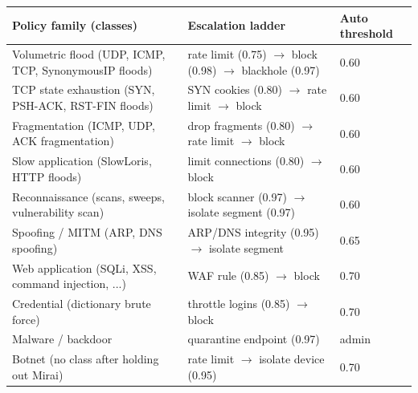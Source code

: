 \documentclass[]{interact}
\theoremstyle{plain}
\theoremstyle{definition}
\begin{document}
\begin{table}[htbp]
{\small
\begin{tabular}{lll}
\toprule
Policy family (classes) & Escalation ladder & Auto threshold \\
\midrule
Volumetric flood (UDP, ICMP, TCP, SynonymousIP floods) & rate limit (0.75) $\rightarrow$ block (0.98) $\rightarrow$ blackhole (0.97) & 0.60 \\
TCP state exhaustion (SYN, PSH-ACK, RST-FIN floods) & SYN cookies (0.80) $\rightarrow$ rate limit $\rightarrow$ block & 0.60 \\
Fragmentation (ICMP, UDP, ACK fragmentation) & drop fragments (0.80) $\rightarrow$ rate limit $\rightarrow$ block & 0.60 \\
Slow application (SlowLoris, HTTP floods) & limit connections (0.80) $\rightarrow$ block & 0.60 \\
Reconnaissance (scans, sweeps, vulnerability scan) & block scanner (0.97) $\rightarrow$ isolate segment (0.97) & 0.60 \\
Spoofing / MITM (ARP, DNS spoofing) & ARP/DNS integrity (0.95) $\rightarrow$ isolate segment & 0.65 \\
Web application (SQLi, XSS, command injection, ...) & WAF rule (0.85) $\rightarrow$ block & 0.70 \\
Credential (dictionary brute force) & throttle logins (0.85) $\rightarrow$ block & 0.70 \\
Malware / backdoor & quarantine endpoint (0.97) & admin \\
Botnet (no class after holding out Mirai) & rate limit $\rightarrow$ isolate device (0.95) & 0.70 \\
\bottomrule
\end{tabular}}
\label{tab:playbooks}
\end{table}
\end{document}
